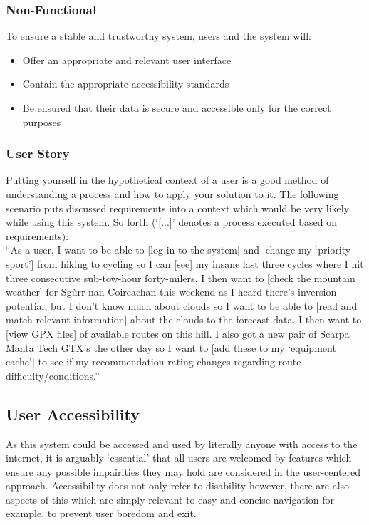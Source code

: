 \documentclass[11pt, english]{article}
\begin{document}
		\subsubsection{Non-Functional}

	To ensure a stable and trustworthy system, users and the system will:

	\begin{itemize}
	\setlength\itemsep{0cm}
		\item Offer an appropriate and relevant user interface 
		\item Contain the appropriate accessibility standards
		\item Be ensured that their data is secure and accessible only for the correct purposes
	\end{itemize}

		\subsubsection{User Story}

	Putting yourself in the hypothetical context of a user is a good method of understanding a process and how to apply your solution to it. The following scenario puts discussed requirements into a context which would be very likely while using this system. So forth (`[...]' denotes a process executed based on requirements):\\

	``As a user, I want to be able to [log-in to the system] and [change my `priority sport'] from hiking to cycling so I can [see] my insane last three cycles where I hit three consecutive sub-tow-hour forty-milers. I then want to [check the mountain weather] for Sg\`{u}rr nan Coireachan this weekend as I heard there's inversion potential, but I don't know much about clouds so I want to be able to [read and match relevant information] about the clouds to the forecast data. I then want to [view GPX files] of available routes on this hill. I also got a new pair of Scarpa Manta Tech GTX's the other day so I want to [add these to my `equipment cache'] to see if my recommendation rating changes regarding route difficulty/conditions.''

	\subsection{User Accessibility}

	As this system could be accessed and used by literally anyone with access to the internet, it is arguably `essential' that all users are welcomed by features which ensure any possible impairities they may hold are considered in the user-centered approach. Accessibility does not only refer to disability however, there are also aspects of this which are simply relevant to easy and concise navigation for example, to prevent user boredom and exit.\\
\end{document}
